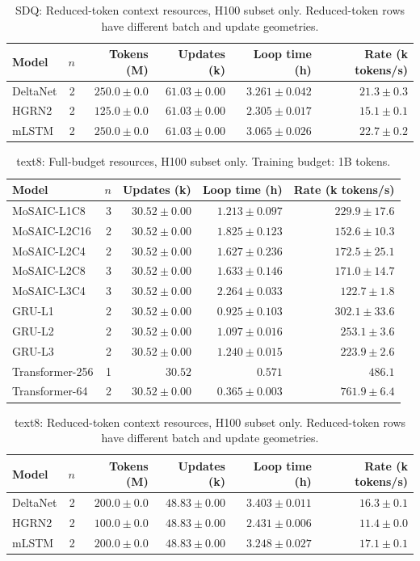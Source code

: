 \begin{table}[H]
\centering
\caption{SDQ: Reduced-token context resources, H100 subset only. Reduced-token rows have different batch and update geometries.}
\begin{tabular}{lrrrrr}
\toprule
Model & $n$ & Tokens (M) & Updates (k) & Loop time (h) & Rate (k tokens/s) \\
\midrule
DeltaNet & 2 & $250.0\pm0.0$ & $61.03\pm0.00$ & $3.261\pm0.042$ & $21.3\pm0.3$ \\
HGRN2 & 2 & $125.0\pm0.0$ & $61.03\pm0.00$ & $2.305\pm0.017$ & $15.1\pm0.1$ \\
mLSTM & 2 & $250.0\pm0.0$ & $61.03\pm0.00$ & $3.065\pm0.026$ & $22.7\pm0.2$ \\
\bottomrule
\end{tabular}
\end{table}

\clearpage
\begin{table}[H]
\centering
\caption{text8: Full-budget resources, H100 subset only. Training budget: 1B tokens.}
\begin{tabular}{lrrrr}
\toprule
Model & $n$ & Updates (k) & Loop time (h) & Rate (k tokens/s) \\
\midrule
MoSAIC-L1C8 & 3 & $30.52\pm0.00$ & $1.213\pm0.097$ & $229.9\pm17.6$ \\
MoSAIC-L2C16 & 2 & $30.52\pm0.00$ & $1.825\pm0.123$ & $152.6\pm10.3$ \\
MoSAIC-L2C4 & 2 & $30.52\pm0.00$ & $1.627\pm0.236$ & $172.5\pm25.1$ \\
MoSAIC-L2C8 & 3 & $30.52\pm0.00$ & $1.633\pm0.146$ & $171.0\pm14.7$ \\
MoSAIC-L3C4 & 3 & $30.52\pm0.00$ & $2.264\pm0.033$ & $122.7\pm1.8$ \\
GRU-L1 & 2 & $30.52\pm0.00$ & $0.925\pm0.103$ & $302.1\pm33.6$ \\
GRU-L2 & 2 & $30.52\pm0.00$ & $1.097\pm0.016$ & $253.1\pm3.6$ \\
GRU-L3 & 2 & $30.52\pm0.00$ & $1.240\pm0.015$ & $223.9\pm2.6$ \\
Transformer-256 & 1 & $30.52$ & $0.571$ & $486.1$ \\
Transformer-64 & 2 & $30.52\pm0.00$ & $0.365\pm0.003$ & $761.9\pm6.4$ \\
\bottomrule
\end{tabular}
\end{table}

\begin{table}[H]
\centering
\caption{text8: Reduced-token context resources, H100 subset only. Reduced-token rows have different batch and update geometries.}
\begin{tabular}{lrrrrr}
\toprule
Model & $n$ & Tokens (M) & Updates (k) & Loop time (h) & Rate (k tokens/s) \\
\midrule
DeltaNet & 2 & $200.0\pm0.0$ & $48.83\pm0.00$ & $3.403\pm0.011$ & $16.3\pm0.1$ \\
HGRN2 & 2 & $100.0\pm0.0$ & $48.83\pm0.00$ & $2.431\pm0.006$ & $11.4\pm0.0$ \\
mLSTM & 2 & $200.0\pm0.0$ & $48.83\pm0.00$ & $3.248\pm0.027$ & $17.1\pm0.1$ \\
\bottomrule
\end{tabular}
\end{table}
